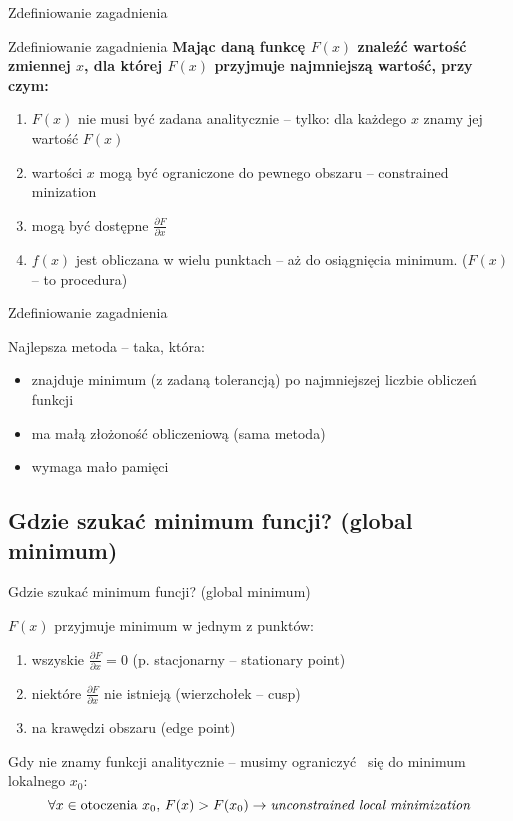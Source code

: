   \begin{frame}{Zdefiniowanie zagadnienia}
    \begin{block}{Zdefiniowanie zagadnienia}
      \textbf{Mając daną funkcę $ F(x) $ znaleźć wartość
      zmiennej $ x $, dla której $ F(x) $ przyjmuje
      najmniejszą wartość, przy czym:}
      \begin{enumerate}
        \item $ F(x) $ nie musi być zadana analitycznie --
        tylko: dla każdego $ x $ znamy jej wartość $ F(x) $
        \item wartości $ x $ mogą być ograniczone do pewnego
        obszaru -- constrained minization
        \item mogą być dostępne $ \frac{\partial F}{\partial x} $
        \item $ f(x) $ jest obliczana w wielu punktach --
        aż do osiągnięcia minimum. ($ F(x) $ -- to procedura)
      \end{enumerate}
    \end{block}
  \end{frame}

  \begin{frame}{Zdefiniowanie zagadnienia}
    \begin{block}{Najlepsza metoda -- taka, która:}
      \begin{itemize}
        \item znajduje minimum (z zadaną tolerancją)
        po najmniejszej liczbie obliczeń funkcji
        \item ma małą złożoność obliczeniową (sama
        metoda)
        \item wymaga mało pamięci
      \end{itemize}
    \end{block}
  \end{frame}

\subsection{Gdzie szukać minimum funcji? (global minimum)}

  \begin{frame}{Gdzie szukać minimum funcji? (global minimum)}
    \begin{block}{$ F(x) $ przyjmuje minimum w jednym z punktów:}
      \begin{enumerate}
        \item wszyskie $ \frac{\partial F}{\partial x} = 0 $
        (p. stacjonarny -- stationary point)
        \item niektóre $ \frac{\partial F}{\partial x} $
        nie istnieją (wierzchołek -- cusp)
        \item na krawędzi obszaru (edge point)
      \end{enumerate}
    \end{block}
    Gdy nie znamy funkcji analitycznie -- musimy ograniczyć~
    się do minimum lokalnego $ x_0 $:
    \begin{displaymath}
      \forall x \in \text{otoczenia}\ x_0{,}\ F(x) > F(x_0)
      \to \text{\emph{unconstrained local minimization}}
    \end{displaymath}
  \end{frame}

